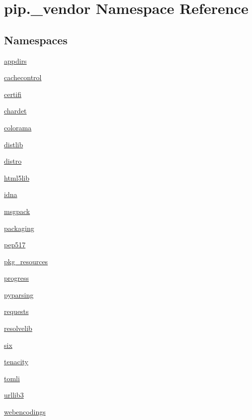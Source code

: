 \hypertarget{namespacepip_1_1__vendor}{}\section{pip.\+\_\+vendor Namespace Reference}
\label{namespacepip_1_1__vendor}
\subsection*{Namespaces}
\begin{DoxyCompactItemize}
\item 
 \hyperlink{namespacepip_1_1__vendor_1_1appdirs}{appdirs}
\item 
 \hyperlink{namespacepip_1_1__vendor_1_1cachecontrol}{cachecontrol}
\item 
 \hyperlink{namespacepip_1_1__vendor_1_1certifi}{certifi}
\item 
 \hyperlink{namespacepip_1_1__vendor_1_1chardet}{chardet}
\item 
 \hyperlink{namespacepip_1_1__vendor_1_1colorama}{colorama}
\item 
 \hyperlink{namespacepip_1_1__vendor_1_1distlib}{distlib}
\item 
 \hyperlink{namespacepip_1_1__vendor_1_1distro}{distro}
\item 
 \hyperlink{namespacepip_1_1__vendor_1_1html5lib}{html5lib}
\item 
 \hyperlink{namespacepip_1_1__vendor_1_1idna}{idna}
\item 
 \hyperlink{namespacepip_1_1__vendor_1_1msgpack}{msgpack}
\item 
 \hyperlink{namespacepip_1_1__vendor_1_1packaging}{packaging}
\item 
 \hyperlink{namespacepip_1_1__vendor_1_1pep517}{pep517}
\item 
 \hyperlink{namespacepip_1_1__vendor_1_1pkg__resources}{pkg\+\_\+resources}
\item 
 \hyperlink{namespacepip_1_1__vendor_1_1progress}{progress}
\item 
 \hyperlink{namespacepip_1_1__vendor_1_1pyparsing}{pyparsing}
\item 
 \hyperlink{namespacepip_1_1__vendor_1_1requests}{requests}
\item 
 \hyperlink{namespacepip_1_1__vendor_1_1resolvelib}{resolvelib}
\item 
 \hyperlink{namespacepip_1_1__vendor_1_1six}{six}
\item 
 \hyperlink{namespacepip_1_1__vendor_1_1tenacity}{tenacity}
\item 
 \hyperlink{namespacepip_1_1__vendor_1_1tomli}{tomli}
\item 
 \hyperlink{namespacepip_1_1__vendor_1_1urllib3}{urllib3}
\item 
 \hyperlink{namespacepip_1_1__vendor_1_1webencodings}{webencodings}
\end{DoxyCompactItemize}
